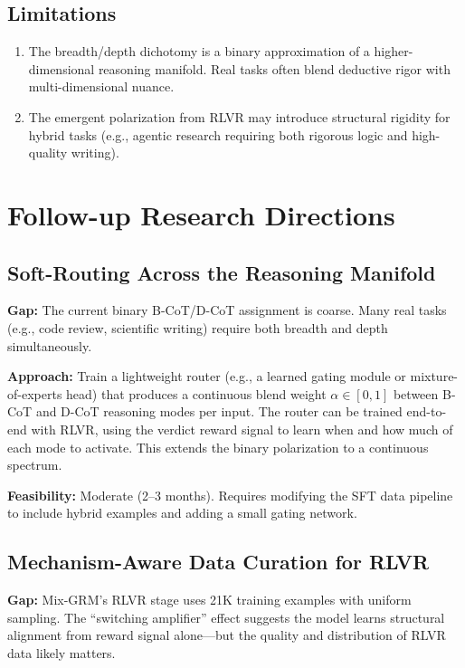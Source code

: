 \documentclass[11pt]{article}
\begin{document}
\subsection{Limitations}

\begin{enumerate}
    \item The breadth/depth dichotomy is a binary approximation of a higher-dimensional reasoning manifold. Real tasks often blend deductive rigor with multi-dimensional nuance.
    \item The emergent polarization from RLVR may introduce structural rigidity for hybrid tasks (e.g., agentic research requiring both rigorous logic and high-quality writing).
\end{enumerate}

\section{Follow-up Research Directions}

\subsection{Soft-Routing Across the Reasoning Manifold}

\textbf{Gap:} The current binary B-CoT/D-CoT assignment is coarse. Many real tasks (e.g., code review, scientific writing) require both breadth and depth simultaneously.

\textbf{Approach:} Train a lightweight router (e.g., a learned gating module or mixture-of-experts head) that produces a continuous blend weight $\alpha \in [0,1]$ between B-CoT and D-CoT reasoning modes per input. The router can be trained end-to-end with RLVR, using the verdict reward signal to learn when and how much of each mode to activate. This extends the binary polarization to a continuous spectrum.

\textbf{Feasibility:} Moderate (2--3 months). Requires modifying the SFT data pipeline to include hybrid examples and adding a small gating network.

\subsection{Mechanism-Aware Data Curation for RLVR}

\textbf{Gap:} Mix-GRM's RLVR stage uses 21K training examples with uniform sampling. The ``switching amplifier'' effect suggests the model learns structural alignment from reward signal alone---but the quality and distribution of RLVR data likely matters.
\end{document}
